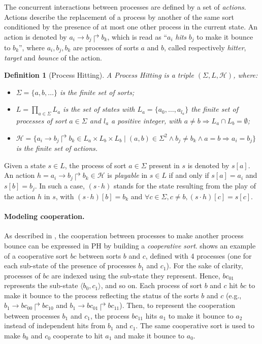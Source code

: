 \documentclass[11pt,a4paper,twoside]{epig}
\def\pref{\prettyref}
\newtheorem{definition}{Definition}{\itshape}{}
\newcommand{\PHs}{\Sigma}
\newcommand{\PHl}{L}
\newcommand{\PHa}{\PHh}
\newcommand{\PHh}{\mathcal{H}}
\def\play{\cdot}
\newcommand{\PHfrappeA}{\rightarrow}
\newcommand{\PHfrappeB}{\Rsh}
\newcommand{\PHfrappe}[3]{#1\PHfrappeA#2\PHfrappeB#3}
\def\PHget#1#2{{#1[#2]}}
\def\PHstate#1{\langle #1 \rangle}
\newcounter{la}
\begin{document}
The concurrent interactions between processes are defined by a set of
\emph{actions}.
Actions describe the replacement of a process by another of the same sort
conditioned by the presence of at most one other process in the current state.
An action is denoted by $\PHfrappe{a_i}{b_j}{b_k}$, which is read as
``$a_i$ \emph{hits} $b_j$ to make it bounce to $b_k$'',
where $a_i,b_j,b_k$ are processes of sorts $a$ and $b$,
called respectively \emph{hitter}, \emph{target} and
\emph{bounce} of the action.

\begin{definition}[Process Hitting]\label{def:PH}
A \emph{Process Hitting} is a triple $(\PHs,\PHl,\PHa)$, where:
\begin{itemize}
\item $\PHs = \{a,b,\dots\}$ is the finite set of \emph{sorts};
\item $\PHl = \prod_{a\in\PHs} \PHl_a$ is the set of states with $\PHl_a = \{a_0,\dots,a_{l_a}\}$
the finite set of \emph{processes} of sort $a\in\Sigma$ and $l_a$ a positive integer, with $a\neq b\Rightarrow \PHl_a \cap \PHl_b = \emptyset$;
\item $\PHa = \{ \PHfrappe{a_i}{b_j}{b_k} \in \PHl_a \times \PHl_b \times \PHl_b \mid (a,b) \in \PHs^2
  \wedge b_j\neq b_k \wedge a=b\Rightarrow a_i=b_j\}$ is the finite set of \emph{actions}.
\end{itemize}
\end{definition}

\noindent
Given a state $s\in \PHl$, the process of sort $a\in\PHs$ present in $s$ is denoted by $\PHget{s}{a}$.
An action $h=\PHfrappe{a_i}{b_j}{b_k} \in \PHa$ is \emph{playable} in $s \in L$ if and only if $\PHget{s}{a}=a_i$ and $\PHget{s}{b} = b_j$.
In such a case, $(s\play h)$ stands for the state resulting from the play of the action $h$ in $s$, with
$\PHget{(s\play h)}{b} = b_k$ and $\forall c \in \PHs, c \neq b, \PHget{(s\play h)}{c} = \PHget{s}{c}$.

\paragraph{Modeling cooperation.}
As described in \cite{PMR10-TCSB}, the cooperation between processes to make another process bounce can be
expressed in PH by building a \emph{cooperative sort}.
\pref{fig:runningPH} shows an example of a cooperative sort $bc$ between sorts $b$ and $c$,
defined with 4 processes (one for each sub-state of the presence of processes $b_1$ and $c_1$).
For the sake of clarity, processes of $bc$ are indexed using the sub-state they represent.
Hence, $bc_{01}$ represents the sub-state $\PHstate{b_0,c_1}$, and so on.
Each process of sort $b$ and $c$ hit $bc$ to make it bounce to the process reflecting the status of the sorts $b$
and $c$ (e.g., $\PHfrappe{b_1}{bc_{00}}{bc_{10}}$ and $\PHfrappe{b_1}{bc_{01}}{bc_{11}}$).
Then, to represent the cooperation between processes $b_1$ and $c_1$,
the process $bc_{11}$ hits $a_1$ to make it bounce to $a_2$ instead of
independent hits from $b_1$ and $c_1$.
The same cooperative sort is used to make $b_0$ and $c_0$ cooperate to hit $a_1$ and make it bounce to $a_0$.
\end{document}
